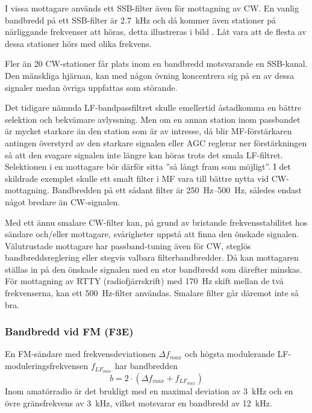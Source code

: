 I vissa mottagare används ett SSB-filter även för mottagning av CW.
En vanlig bandbredd på ett SSB-filter är \qty{2,7}{\kilo\hertz} och då kommer
även stationer på närliggande frekvenser att höras, detta illustreras i bild
.
Låt vara att de flesta av dessa stationer hörs med olika frekvens.


Fler än 20 CW-stationer får plats inom en bandbredd motsvarande en SSB-kanal.
Den mänskliga hjärnan, kan med någon övning koncentrera sig på en av dessa
signaler medan övriga uppfattas som störande.

Det tidigare nämnda LF-bandpassfiltret skulle emellertid åstadkomma en
bättre selektion och bekvämare avlyssning.
Men om en annan station inom passbandet är mycket starkare än den station
som är av intresse, då blir MF-förstärkaren antingen överstyrd av den
starkare signalen eller AGC reglerar ner förstärkningen så att den svagare
signalen inte längre kan höras trots det smala LF-filtret.
Selektionen i en mottagare bör därför sitta ''så långt fram som möjligt''.
I det skildrade exemplet skulle ett smalt filter i MF vara till bättre nytta
vid CW-mottagning.
Bandbredden på ett sådant filter är \SIrange{250}{500}{\hertz}, således endast
något bredare än CW-signalen.

Med ett ännu smalare CW-filter kan, på grund av bristande frekvensstabilitet hos
sändare och/eller mottagare, svårigheter uppstå att finna den önskade signalen.
Välutrustade mottagare har passband-tuning även för CW, steglös
bandbreddsreglering eller stegvis valbara filterbandbredder.
Då kan mottagaren ställas in på den önskade signalen med en stor bandbredd
som därefter minskas.
För mottagning av RTTY (radiofjärrskrift) med \qty{170}{\hertz} skift mellan de
två frekvenserna, kan ett \qty{500}{\hertz}-filter användas.
Smalare filter går däremot inte så bra.

\subsubsection{Bandbredd vid FM (F3E)}
\label{bandbredd_fm}

En FM-sändare med frekvensdeviationen \(\Delta f_{max}\) och högsta
modulerande LF-moduleringsfrekvensen \(f_{LF_{max}}\) har bandbredden
\[ b = 2 \cdot (\Delta f_{max} + f_{LF_{max}}) \]
Inom amatörradio är det brukligt med en maximal deviation av \qty{3}{\kilo\hertz}
och en övre gränsfrekvens av \qty{3}{\kilo\hertz}, vilket motsvarar en bandbredd
av \qty{12}{\kilo\hertz}.

